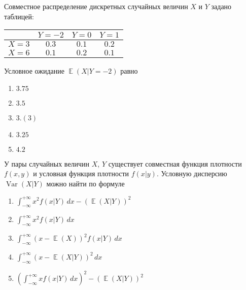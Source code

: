 \documentclass[t]{beamer}
\DeclareMathOperator{\Var}{Var}
\DeclareMathOperator{\E}{\mathbb{E}}
\begin{document}
 \begin{frame} \label{6} 
\begin{block}{6} 

Совместное распределение дискретных случайных величин $X$ и $Y$ задано таблицей:

\begin{center}
\begin{tabular}{cccc}
\toprule
 & $Y=-2$ & $Y=0$ & $Y=1$ \\
\midrule
$X=3$ & $0.3$ & $0.1$ & $0.2$  \\
$X=6$ & $0.1$ & $0.2$ & $0.1$ \\
\bottomrule
\end{tabular}
\end{center}
Условное ожидание $\E(X|Y=-2)$ равно

 \end{block} 
\begin{enumerate} 
\item[] \hyperlink{6-Yes}{\beamergotobutton{} $3.75$}
\item[] \hyperlink{6-No}{\beamergotobutton{} $3.5$}
\item[] \hyperlink{6-No}{\beamergotobutton{} $3.(3)$}
\item[] \hyperlink{6-No}{\beamergotobutton{} $3.25$}
\item[] \hyperlink{6-No}{\beamergotobutton{} $4.2$}
\end{enumerate} 
\end{frame} 


 \begin{frame} \label{7} 
\begin{block}{7} 

У пары случайных величин $X$, $Y$ существует совместная функция плотности $f(x,y)$ и условная функция плотности $f(x|y)$. Условную дисперсию $\Var(X|Y)$ можно найти по формуле
  


 \end{block} 
\begin{enumerate} 
\item[] \hyperlink{7-Yes}{\beamergotobutton{} $\int_{-\infty}^{+\infty} x^2 f(x|Y) \, dx - (\E(X|Y))^2$}
\item[] \hyperlink{7-No}{\beamergotobutton{} $\int_{-\infty}^{+\infty} x^2 f(x|Y) \, dx$}
\item[] \hyperlink{7-No}{\beamergotobutton{} $\int_{-\infty}^{+\infty} (x - \E(X))^2 f(x|Y) \, dx$}
\item[] \hyperlink{7-No}{\beamergotobutton{} $\int_{-\infty}^{+\infty} (x - \E(X|Y))^2 \, dx$}
\item[] \hyperlink{7-No}{\beamergotobutton{} $\left(\int_{-\infty}^{+\infty} x f(x|Y) \, dx\right)^2 - (\E(X|Y))^2$}
\end{enumerate} 
\end{frame} 
\end{document}
